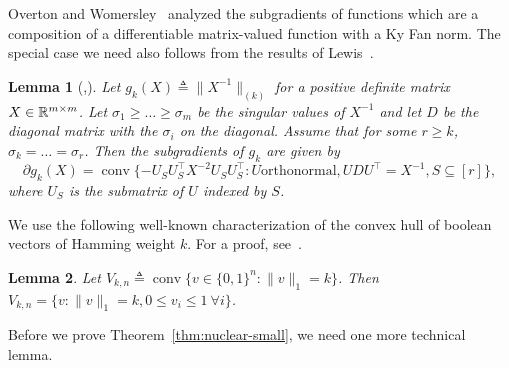 \documentclass{article}
\newtheorem{lemma}{Lemma}[theorem]
\DeclareMathOperator{\conv}{conv}
\newcommand{\tra}{\intercal}
\begin{document}
Overton and Womersley~\cite{OvertonW93-kyfan} analyzed the
subgradients of functions which are a composition of a differentiable
matrix-valued function with a Ky Fan norm. The special case we need
also follows from the results of Lewis~\cite{Lewis95-matfunc}.
\begin{lemma}[\cite{OvertonW93-kyfan},\cite{Lewis95-matfunc}]\label{lm:kyfan-subgr}
  Let $g_k(X) \triangleq \|X^{-1}\|_{(k)}$ for a positive definite
  matrix $X \in {\mathbb{R}}^{m\times m}$. Let $\sigma_1 \ge \ldots \geq \sigma_m$ be the
  singular values of $X^{-1}$ and let $D$ be the diagonal matrix
  with the $\sigma_i$ on the diagonal. Assume that for some $r \geq
  k$, $\sigma_k = \ldots = \sigma_r$. Then the subgradients of $g_k$ are
  given by
  \[
  \partial g_k(X) = \conv\{-U_SU_S^\tra X^{-2} U_SU_S^\tra: U
  \text{orthonormal}, UD U^\tra = X^{-1}, S \subseteq [r]\},
  \]
  where $U_S$ is the submatrix of $U$ indexed by $S$. 
\end{lemma}

We use the following well-known characterization of the convex
hull of boolean vectors of Hamming weight $k$. For a proof,
see~\cite{schrijver-combop-B}. 

\begin{lemma}\label{lm:unik-poly}
  Let $V_{k,n} \triangleq \conv\{v \in \{0, 1\}^n: \|v\|_1 = k\}$. Then
  $V_{k,n} = \{v: \|v\|_1 = k, 0\leq v_i \leq 1~\forall i\}$. 
\end{lemma}

Before we prove Theorem~\ref{thm:nuclear-small}, we need one more
technical lemma.
\end{document}
